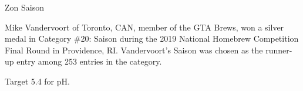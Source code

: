 \stylesection{\stylesaison}

\begin{recipie}{Zon Saison}

\begin{aboutblock}
Mike Vandervoort of Toronto, CAN, member of the GTA Brews, won a silver medal
in Category \#20: Saison during the 2019 National Homebrew Competition Final Round
in Providence, RI. Vandervoort’s Saison was chosen as the runner-up entry among 253
entries in the category.
\end{aboutblock}


\begin{methodandtiming}
 
\begin{mashsteps}
\end{mashsteps}

\begin{fermentationsteps}
\end{fermentationsteps}

\begin{directions}
Target 5.4 for pH.
\end{directions}

\end{methodandtiming}

\pagebreak

\begin{ingredientsblock}

\begin{malts}
\end{malts}

\begin{hops}
\end{hops}

\begin{yeasts}
\end{yeasts}

\end{ingredientsblock}

\end{recipie}

